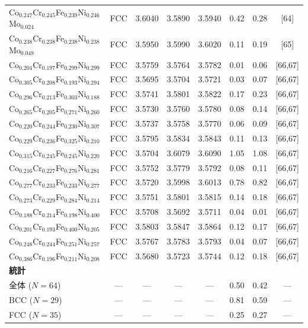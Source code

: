 \documentclass[a4paper,10pt,5p]{elsarticle}
\begin{document}
\begin{table}[htbp]
\begin{tabular}{lccccccc}
    Co$_{0.247}$Cr$_{0.245}$Fe$_{0.239}$Ni$_{0.246}$Mo$_{0.024}$ & FCC & 3.6040 & 3.5890 & 3.5940 & 0.42 & 0.28 & [64] \\
    Co$_{0.238}$Cr$_{0.238}$Fe$_{0.238}$Ni$_{0.238}$Mo$_{0.048}$ & FCC & 3.5950 & 3.5990 & 3.6020 & 0.11 & 0.19 & [65] \\
    Co$_{0.204}$Cr$_{0.197}$Fe$_{0.299}$Ni$_{0.299}$ & FCC & 3.5759 & 3.5764 & 3.5782 & 0.01 & 0.06 & [66,67] \\
    Co$_{0.305}$Cr$_{0.208}$Fe$_{0.193}$Ni$_{0.294}$ & FCC & 3.5695 & 3.5704 & 3.5721 & 0.03 & 0.07 & [66,67] \\
    Co$_{0.296}$Cr$_{0.213}$Fe$_{0.303}$Ni$_{0.188}$ & FCC & 3.5741 & 3.5801 & 3.5822 & 0.17 & 0.23 & [66,67] \\
    Co$_{0.265}$Cr$_{0.205}$Fe$_{0.271}$Ni$_{0.260}$ & FCC & 3.5730 & 3.5760 & 3.5780 & 0.08 & 0.14 & [66,67] \\
    Co$_{0.220}$Cr$_{0.244}$Fe$_{0.230}$Ni$_{0.307}$ & FCC & 3.5737 & 3.5758 & 3.5770 & 0.06 & 0.09 & [66,67] \\
    Co$_{0.229}$Cr$_{0.236}$Fe$_{0.325}$Ni$_{0.210}$ & FCC & 3.5795 & 3.5834 & 3.5843 & 0.11 & 0.13 & [66,67] \\
    Co$_{0.315}$Cr$_{0.245}$Fe$_{0.245}$Ni$_{0.220}$ & FCC & 3.5704 & 3.6079 & 3.6090 & 1.05 & 1.08 & [66,67] \\
    Co$_{0.216}$Cr$_{0.227}$Fe$_{0.276}$Ni$_{0.281}$ & FCC & 3.5752 & 3.5779 & 3.5792 & 0.08 & 0.11 & [66,67] \\
    Co$_{0.277}$Cr$_{0.233}$Fe$_{0.233}$Ni$_{0.277}$ & FCC & 3.5720 & 3.5998 & 3.6013 & 0.78 & 0.82 & [66,67] \\
    Co$_{0.273}$Cr$_{0.229}$Fe$_{0.284}$Ni$_{0.214}$ & FCC & 3.5751 & 3.5801 & 3.5815 & 0.14 & 0.18 & [66,67] \\
    Co$_{0.188}$Cr$_{0.214}$Fe$_{0.198}$Ni$_{0.400}$ & FCC & 3.5708 & 3.5692 & 3.5711 & 0.04 & 0.01 & [66,67] \\
    Co$_{0.201}$Cr$_{0.193}$Fe$_{0.400}$Ni$_{0.205}$ & FCC & 3.5803 & 3.5847 & 3.5864 & 0.12 & 0.17 & [66,67] \\
    Co$_{0.248}$Cr$_{0.244}$Fe$_{0.251}$Ni$_{0.257}$ & FCC & 3.5767 & 3.5783 & 3.5793 & 0.04 & 0.07 & [66,67] \\
    Co$_{0.386}$Cr$_{0.196}$Fe$_{0.211}$Ni$_{0.208}$ & FCC & 3.5680 & 3.5723 & 3.5744 & 0.12 & 0.18 & [66,67] \\
\hline
\multicolumn{8}{l}{\textbf{統計}} \\
\hline
全体 ($N = 64$) & --- & --- & --- & --- & 0.50 & 0.42 & --- \\
BCC ($N = 29$) & --- & --- & --- & --- & 0.81 & 0.59 & --- \\
FCC ($N = 35$) & --- & --- & --- & --- & 0.25 & 0.27 & --- \\
\hline
\end{tabular}
\end{table}
\end{document}
